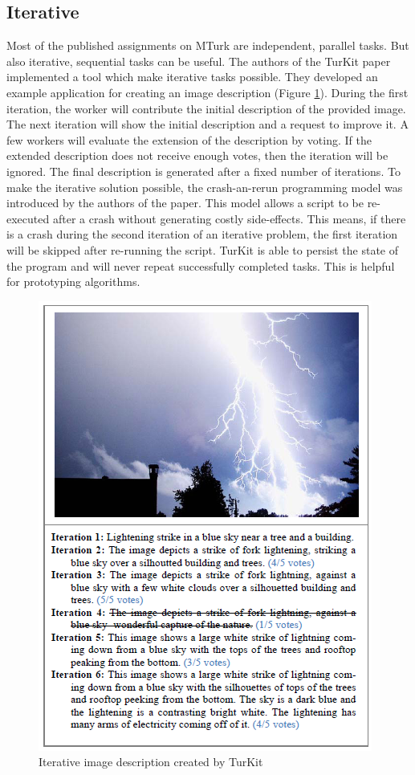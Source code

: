 \subsection{Iterative}
\label{iterative}
Most of the published assignments on MTurk are independent, parallel tasks. But also iterative, sequential tasks can be useful. The authors of the TurKit paper \cite{turkit} implemented a tool which make iterative tasks possible. They developed an example application for creating an image description (Figure \ref{turkit}). During the first iteration, the worker will contribute the initial description of the provided image. The next iteration will show the initial description and a request to improve it. A few workers will evaluate the extension of the description by voting. If the extended description does not receive enough votes, then the iteration will be ignored. The final description is generated after a fixed number of iterations. To make the iterative solution possible, the crash-an-rerun programming model was introduced by the authors of the paper. This model allows a script to be re-executed after a crash without generating costly side-effects. This means, if there is a crash during the second iteration of an iterative problem, the first iteration will be skipped after re-running the script. TurKit is able to persist the state of the program and will never repeat successfully completed tasks. This is helpful for prototyping algorithms.
\begin{figure}
\centering
\includegraphics[scale=0.65]{images/turkit_description_example.png}
\caption{Iterative image description created by TurKit}
\label{turkit}
\end{figure}

